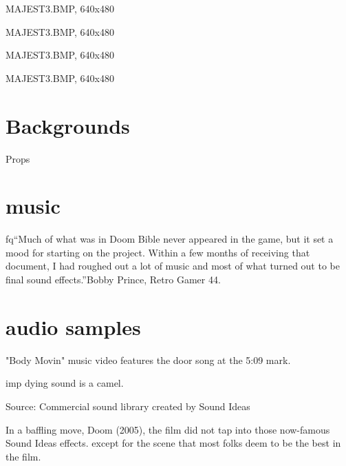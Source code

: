 \begin{minipage}{\textwidth}
\par
MAJEST3.BMP, 640x480\\
\par
{}
\end{minipage}
\par


\begin{minipage}{\textwidth}
\par
MAJEST3.BMP, 640x480\\
\par
{}
\end{minipage}

\par

\begin{minipage}{\textwidth}
\par
MAJEST3.BMP, 640x480\\
\par
{}
\end{minipage}


\begin{minipage}{\textwidth}
\par
MAJEST3.BMP, 640x480\\
\par
{}
\end{minipage}


\section{Backgrounds}
Props

\section{music}
fq{“Much of what was in Doom Bible never appeared in the game, but it set a mood for starting on the project. Within a few months of receiving that document, I had roughed out a lot of music and most of what turned out to be final sound effects.”}{Bobby Prince, Retro Gamer 44.}

\section{audio samples}

"Body Movin" music video features the door song at the 5:09 mark.\\
\par
imp dying sound is a camel.\\
\par
Source: Commercial sound library created by Sound Ideas\\
\par
In a baffling move, Doom (2005), the film did not tap into those now-famous Sound Ideas effects. except for the scene that most folks deem to be the best in the film.\\

